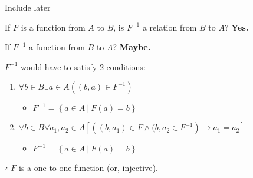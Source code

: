 \begin{theorem}[Textbook 6.3.5]
Include later
\end{theorem}
\begin{proposition}
If $F$ is a function from $A$ to $B$, is $F^{-1}$ a relation from $B$ to $A$? \textbf{Yes.}
\end{proposition}
\begin{proposition}
If $F^{-1}$ a function from $B$ to $A$? \textbf{Maybe.}
\end{proposition}
\noindent
$F^{-1}$ would have to satisfy 2 conditions:
\begin{enumerate}
\item $\forall b \in B \exists a \in A \left( (b,a) \in F^{-1} \right)$
    \begin{itemize}
        \item $F^{-1} = \left\{ a\in A\ |\ F(a) = b\right\}$
    \end{itemize}
\item $\forall b \in B \forall a_1,a_2\in A \left[ \left( (b,a_1) \in F \wedge (b,a_2\in F^{-1} \right) \to a_1=a_2 \right]$
    \begin{itemize}
        \item $F^{-1} = \left\{ a\in A\ |\ F(a) = b\right\}$
    \end{itemize}
\end{enumerate}

\noindent
$\therefore\ F$ is a one-to-one function (or, injective).



